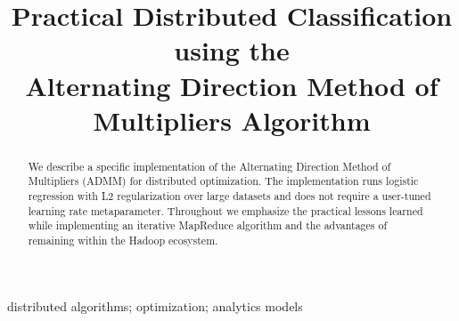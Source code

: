 \documentclass[10pt, conference, compsocconf]{IEEEtran}
\begin{document}
%
\title{Practical Distributed Classification using the\\ Alternating Direction Method of Multipliers Algorithm}



\author{
}






\maketitle


\begin{abstract}
We describe a specific implementation of the Alternating Direction Method of Multipliers (ADMM) for distributed optimization.  The implementation runs logistic regression with L2 regularization over large datasets and does not require a user-tuned learning rate metaparameter.  Throughout we emphasize the practical lessons learned while implementing an iterative MapReduce algorithm and the advantages of remaining within the Hadoop ecosystem.
\end{abstract}

\begin{IEEEkeywords}
distributed algorithms; optimization; analytics models
\end{IEEEkeywords}


%
\IEEEpeerreviewmaketitle
\end{document}
